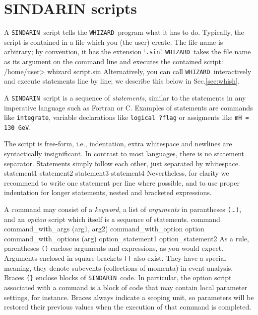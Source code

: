 \documentclass[12pt]{book}
\newenvironment{interaction}%
  {\begingroup\small
   \verbatim}%
  {\endverbatim
   \endgroup\noindent}
\newenvironment{code}%
  {\begingroup\footnotesize
   \quote
   \verbatim}%
  {\endverbatim
   \endquote
   \endgroup\noindent}
\newcommand{\ttt}[1]{\texttt{#1}}
\newcommand{\whizard}{\texttt{WHIZARD}}
\newcommand{\sindarin}{\texttt{SINDARIN}}
\begin{document}
\section{SINDARIN scripts}

A \sindarin\ script tells the \whizard\ program what it has to do.  Typically,
the script is contained in a file which you (the user) create.  The file name
is arbitrary; by convention, it has the extension `\verb|.sin|'.
\whizard\ takes the file name as its argument on the command line and
executes the contained script:
\begin{interaction}
/home/user> whizard script.sin
\end{interaction}
Alternatively, you can call \whizard\ interactively and execute
statements line by line; we describe this below in Sec.\ref{sec:whish}.

A \sindarin\ script is a sequence of \emph{statements}, similar to the
statements in any imperative language such as Fortran or C.  Examples
of statements are commands like \ttt{integrate}, variable declarations
like \ttt{logical ?flag} or assigments like \ttt{mH = 130 GeV}.

The script is free-form, i.e., indentation, extra whitespace and
newlines are syntactically insignificant.  In contrast to most
languages, there is no statement separator.  Statements simply follow each
other, just separated by whitespace.  
\begin{code}
statement1 statement2
statement3
               statement4
\end{code}
Nevertheless, for clarity we recommend to
write one statement per line where possible, and to use proper
indentation for longer statements, nested and bracketed expressions.

A command may consist of a \emph{keyword}, a list of \emph{arguments} in
parantheses \ttt{(}\ldots\ttt{)}, and an \emph{option} script which
itself is a sequence of statements.
\begin{code}
command
command_with_args (arg1, arg2)
command_with_option { option }
command_with_options (arg) {
  option_statement1
  option_statement2
}
\end{code}
As a rule, parentheses \ttt{()} enclose arguments and expressions, as
you would expect.  Arguments enclosed in square brackets \ttt{[]} also
exist.  They have a special meaning, they denote subevents
(collections of momenta) in event analysis.  Braces \ttt{\{\}} enclose
blocks of \sindarin\ code.  In particular, the option script
associated with a command is a block of code that may contain local
parameter settings, for instance.  Braces always indicate a scoping
unit, so parameters will be restored their previous values when the
execution of that command is completed.
\end{document}
